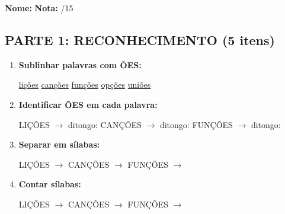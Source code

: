 \begin{exercicio}

\noindent\textbf{Nome:} \underline{\hspace{4cm}} \quad \textbf{Nota:} \underline{\hspace{1cm}}/15

\subsection*{PARTE 1: RECONHECIMENTO (5 itens)}

\begin{enumerate}
  \item \textbf{Sublinhar palavras com ÕES:}
  \begin{center}
  \uline{lições} \quad \uline{canções} \quad \uline{funções} \quad \uline{opções} \quad \uline{uniões}
  \end{center}

  \item \textbf{Identificar ÕES em cada palavra:}
  \begin{center}
  LIÇÕES $\rightarrow$ ditongo: \underline{\hspace{1cm}} \quad CANÇÕES $\rightarrow$ ditongo: \underline{\hspace{1cm}} \quad FUNÇÕES $\rightarrow$ ditongo: \underline{\hspace{1cm}}
  \end{center}

  \item \textbf{Separar em sílabas:}
  \begin{center}
  LIÇÕES $\rightarrow$ \underline{\hspace{1.5cm}} \underline{\hspace{1.5cm}} \underline{\hspace{1.5cm}} \quad CANÇÕES $\rightarrow$ \underline{\hspace{1.5cm}} \underline{\hspace{1.5cm}} \underline{\hspace{1.5cm}} \quad FUNÇÕES $\rightarrow$ \underline{\hspace{1.5cm}} \underline{\hspace{1.5cm}} \underline{\hspace{1.5cm}}
  \end{center}

  \item \textbf{Contar sílabas:}
  \begin{center}
  LIÇÕES $\rightarrow$ \underline{\hspace{1cm}} \quad CANÇÕES $\rightarrow$ \underline{\hspace{1cm}} \quad FUNÇÕES $\rightarrow$ \underline{\hspace{1cm}}
  \end{center}


\end{enumerate}
\end{exercicio}
